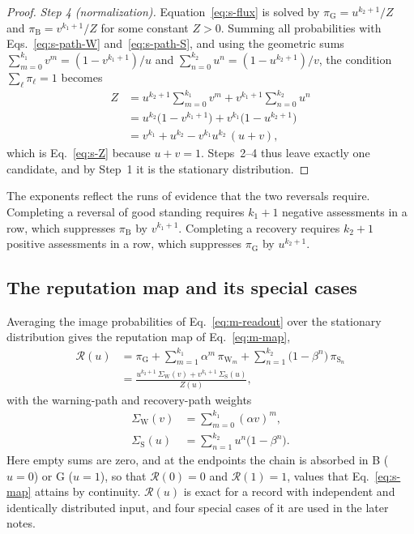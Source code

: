 \documentclass[10pt]{wlscirep}
\newcommand{\Rmap}{\mathscr{R}}            %
\newcommand{\st}[1]{\mathrm{#1}}           %
\theoremstyle{plain}
\theoremstyle{remark}
\begin{document}
\begin{proof}
\textit{Step 4 (normalization).} Equation~\eqref{eq:s-flux} is solved by $\pi_{\st G}=u^{k_2+1}/Z$ and $\pi_{\st B}=v^{k_1+1}/Z$ for some constant $Z>0$. Summing all probabilities with Eqs.~\eqref{eq:s-path-W} and~\eqref{eq:s-path-S}, and using the geometric sums $\sum_{m=0}^{k_1}v^m=(1-v^{k_1+1})/u$ and $\sum_{n=0}^{k_2}u^n=(1-u^{k_2+1})/v$, the condition $\sum_\ell\pi_\ell=1$ becomes
\begin{equation}
\begin{aligned}
Z&=u^{k_2+1}\sum_{m=0}^{k_1}v^m+v^{k_1+1}\sum_{n=0}^{k_2}u^n\\
&=u^{k_2}\bigl(1-v^{k_1+1}\bigr)+v^{k_1}\bigl(1-u^{k_2+1}\bigr)\\
&=v^{k_1}+u^{k_2}-v^{k_1}u^{k_2}\,(u+v),
\end{aligned}
\label{eq:s-normalization}
\end{equation}
which is Eq.~\eqref{eq:s-Z} because $u+v=1$. Steps~2--4 thus leave exactly one candidate, and by Step~1 it is the stationary distribution.
\end{proof}

The exponents reflect the runs of evidence that the two reversals require. Completing a reversal of good standing requires $k_1+1$ negative assessments in a row, which suppresses $\pi_{\st B}$ by $v^{k_1+1}$. Completing a recovery requires $k_2+1$ positive assessments in a row, which suppresses $\pi_{\st G}$ by $u^{k_2+1}$.

\subsection{The reputation map and its special cases}

Averaging the image probabilities of Eq.~\eqref{eq:m-readout} over the stationary distribution gives the reputation map of Eq.~\eqref{eq:m-map},
\begin{equation}
\begin{aligned}
\Rmap(u)&=\pi_{\st G}+\sum_{m=1}^{k_1}\alpha^m\,\pi_{\st W_m}+\sum_{n=1}^{k_2}\bigl(1-\beta^n\bigr)\,\pi_{\st S_n}\\
&=\frac{u^{k_2+1}\,\Sigma_{\mathrm W}(v)+v^{k_1+1}\,\Sigma_{\mathrm S}(u)}{Z(u)},
\end{aligned}
\label{eq:s-map}
\end{equation}
with the warning-path and recovery-path weights
\begin{equation}
\begin{aligned}
\Sigma_{\mathrm W}(v)&=\sum_{m=0}^{k_1}(\alpha v)^m,\\
\Sigma_{\mathrm S}(u)&=\sum_{n=1}^{k_2}u^n\bigl(1-\beta^n\bigr).
\end{aligned}
\label{eq:s-weights}
\end{equation}
Here empty sums are zero, and at the endpoints the chain is absorbed in B ($u=0$) or G ($u=1$), so that $\Rmap(0)=0$ and $\Rmap(1)=1$, values that Eq.~\eqref{eq:s-map} attains by continuity. $\Rmap(u)$ is exact for a record with independent and identically distributed input, and four special cases of it are used in the later notes.
\end{document}
